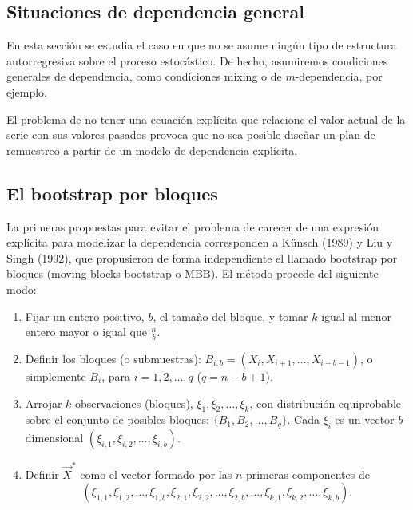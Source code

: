 \documentclass[
]{book}
\theoremstyle{definition}
\theoremstyle{definition}
\theoremstyle{definition}
\theoremstyle{remark}
\begin{document}
\hypertarget{situaciones-de-dependencia-general-1}{%
\subsection{Situaciones de dependencia general}\label{situaciones-de-dependencia-general-1}}

En esta sección se estudia el caso en que no se asume ningún tipo de
estructura autorregresiva sobre el proceso estocástico. De hecho,
asumiremos condiciones generales de dependencia, como condiciones mixing
o de \(m\)-dependencia, por ejemplo.

El problema de no tener una ecuación explícita que relacione el valor
actual de la serie con sus valores pasados provoca que no sea posible
diseñar un plan de remuestreo a partir de un modelo de dependencia
explícita.

\hypertarget{el-bootstrap-por-bloques}{%
\subsection{El bootstrap por bloques}\label{el-bootstrap-por-bloques}}

La primeras propuestas para evitar el problema de carecer de una
expresión explícita para modelizar la dependencia corresponden a Künsch
(1989) y Liu y Singh (1992), que propusieron de forma independiente el
llamado bootstrap por bloques (moving blocks bootstrap o MBB). El método
procede del siguiente modo:

\begin{enumerate}
\def\labelenumi{\arabic{enumi}.}
\item
  Fijar un entero positivo, \(b\), el tamaño del bloque, y tomar \(k\)
  igual al menor entero mayor o igual que \(\frac{n}{b}\).
\item
  Definir los bloques (o submuestras): \(B_{i,b}=(X_i,X_{i+1},\ldots ,X_{i+b-1})\), o simplemente \(B_i\), para \(i=1,2,\ldots ,q\)
  (\(q=n-b+1\))\(.\)
\item
  Arrojar \(k\) observaciones (bloques), \(\xi _1,\xi _2,\ldots ,\xi _{k}\), con distribución equiprobable sobre el conjunto de posibles
  bloques: \(\{B_1,B_2,\ldots ,B_{q}\}\). Cada \(\xi _i\) es un
  vector \(b\)-dimensional \((\xi _{i,1},\xi _{i,2},\ldots ,\xi _{i,b})\).
\item
  Definir \(\vec{X}^{\ast}\) como el vector formado por las \(n\)
  primeras componentes de
  \[(\xi _{1,1},\xi _{1,2},\ldots ,\xi _{1,b},\xi _{2,1},\xi _{2,2},\ldots ,\xi
  _{2,b},\ldots ,\xi _{k,1},\xi _{k,2},\ldots ,\xi _{k,b}).\]
\end{enumerate}
\end{document}
